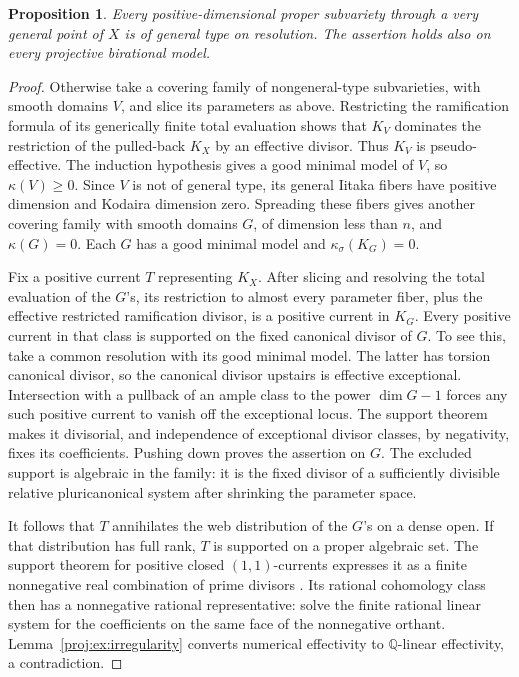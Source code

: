 \documentclass[11pt,letterpaper]{article}
\newcommand{\Q}{\mathbb{Q}}
\newtheorem{proposition}[theorem]{Proposition}
\theoremstyle{definition}
\theoremstyle{remark}
\begin{document}
\begin{proposition}\label{proj:prop:general-type}
Every positive-dimensional proper subvariety through a very general
point of \(X\) is of general type on resolution. The assertion holds
also on every projective birational model.
\end{proposition}
\begin{proof}
Otherwise take a covering family of nongeneral-type subvarieties,
with smooth domains \(V\), and slice its parameters as above.
Restricting the ramification formula of its generically finite
total evaluation shows that \(K_V\) dominates the restriction of
the pulled-back \(K_X\) by an effective divisor. Thus \(K_V\) is
pseudo-effective. The induction hypothesis gives a good minimal
model of \(V\), so \(\kappa(V)\geq0\). Since \(V\) is not of general
type, its general Iitaka fibers have positive dimension and
Kodaira dimension zero. Spreading these fibers gives another
covering family with smooth domains \(G\), of dimension less than
\(n\), and \(\kappa(G)=0\). Each \(G\) has a good minimal model and
\(\kappa_\sigma(K_G)=0\).

Fix a positive current \(T\) representing \(K_X\). After slicing and
resolving the total evaluation of the \(G\)'s, its restriction to
almost every parameter fiber, plus the effective restricted
ramification divisor, is a positive current in \(K_G\).
Every positive current in that class is supported on the fixed
canonical divisor of \(G\). To see this, take a common resolution
with its good minimal model. The latter has torsion canonical
divisor, so the canonical divisor upstairs is effective exceptional.
Intersection with a pullback of an ample class to the power
\(\dim G-1\) forces any such positive current to vanish off the
exceptional locus. The support theorem makes it divisorial, and
independence of exceptional divisor classes, by negativity, fixes
its coefficients. Pushing down proves the assertion on \(G\).
The excluded support is algebraic in the family: it is the fixed
divisor of a sufficiently divisible relative pluricanonical
system after shrinking the parameter space.

It follows that \(T\) annihilates the web distribution of the
\(G\)'s on a dense open. If that distribution has full rank, \(T\)
is supported on a proper algebraic set. The support theorem for
positive closed \((1,1)\)-currents expresses it as a finite
nonnegative real combination of prime divisors
\cite{Proj-Siu1974,Proj-Demailly2012}. Its rational cohomology class then has
a nonnegative rational representative: solve the finite rational
linear system for the coefficients on the same face of the
nonnegative orthant. Lemma~\ref{proj:ex:irregularity} converts numerical
effectivity to \(\Q\)-linear effectivity, a contradiction.


\end{proof}
\end{document}

